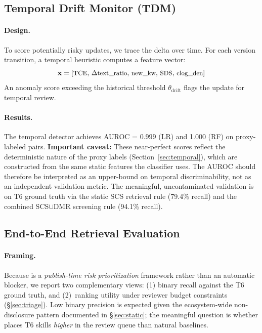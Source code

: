 \subsection{Temporal Drift Monitor (TDM)}

\paragraph{Design.}
To score potentially risky updates, we trace the delta over time. For each version transition, a temporal heuristic computes a feature vector:
\begin{equation}
\small
\mathbf{x} = [\text{TCE},\, \Delta\text{text\_ratio},\, \text{new\_kw},\, \text{SDS},\, \text{clog\_den}]
\label{eq:l3_vector}
\end{equation}
An anomaly score exceeding the historical threshold $\theta_{\text{drift}}$ flags the update for temporal review.

\paragraph{Results.}
The temporal detector achieves AUROC = 0.999 (LR) and 1.000 (RF) on proxy-labeled pairs.
\textbf{Important caveat:} These near-perfect scores reflect the deterministic nature of the proxy labels
(Section~\ref{sec:temporal}), which are constructed from the same static features the classifier uses.
The AUROC should therefore be interpreted as an upper-bound on temporal discriminability, not as
an independent validation metric. The meaningful, uncontaminated validation is on T6 ground truth
via the static SCS retrieval rule (79.4\% recall) and the combined SCS$\cup$DMR screening rule (94.1\% recall).

\subsection{End-to-End Retrieval Evaluation}
\label{sec:e2e}

\paragraph{Framing.}
Because \sysname is a \emph{publish-time risk prioritization} framework
rather than an automatic blocker, we report two complementary views:
(1) binary recall against the T6 ground truth, and
(2)~ranking utility under reviewer budget constraints (\S\ref{sec:triage}).
Low binary precision is expected given the ecosystem-wide non-disclosure pattern
documented in \S\ref{sec:static}; the meaningful question is whether
\sysname places T6 skills \emph{higher} in the review queue than natural baselines.

